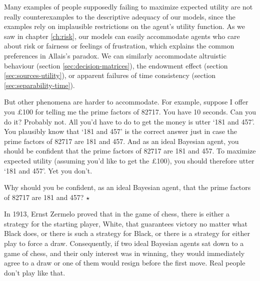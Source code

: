 Many examples of people supposedly failing to maximize expected
utility are not really counterexamples to the descriptive adequacy of
our models, since the examples rely on implausible restrictions on the agent's
utility function. As we saw in chapter \ref{ch:risk}, our models can easily
accommodate agents who care about risk or fairness or feelings of
frustration, which explains the common preferences in Allais's
paradox. We can similarly accommodate altruistic behaviour (section
\ref{sec:decision-matrices}), the endowment effect (section
\ref{sec:sources-utility}), or apparent failures of time consistency
(section \ref{sec:separability-time}).


But other phenomena are harder to accommodate. For example, suppose I
offer you £100 for telling me the prime factors of 82717. You have 10
seconds. Can you do it? Probably not. All you'd have to do to get the
money is utter `181 and 457'. You plausibly know that `181 and 457' is
the correct answer just in case the prime factors of 82717 are 181 and
457. And as an ideal Bayesian agent, you should be confident that the
prime factors of 82717 are 181 and 457. To maximize expected utility
(assuming you'd like to get the £100), you should therefore utter `181
and 457'. Yet you don't.

\begin{exercise}
  Why should you be confident, as an ideal Bayesian agent, that the
  prime factors of 82717 are 181 and 457? $\star$
\end{exercise}

In 1913, Ernst Zermelo proved that in the game of chess, there is
either a strategy for the starting player, White, that guarantees
victory no matter what Black does, or there is such a strategy for
Black, or there is a strategy for either play to force a
draw. Consequently, if two ideal Bayesian agents sat down to a game of
chess, and their only interest was in winning, they would
immediately agree to a draw or one of them would resign before the
first move. Real people don't play like that.

